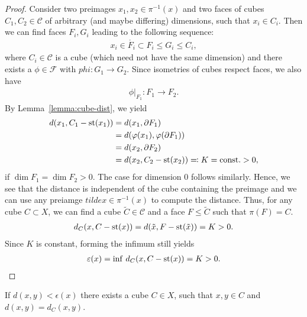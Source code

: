 \begin{proof}
  Consider two preimages \(x_1, x_2 \in \pi^{-1}(x)\) and two faces of cubes \(C_1, C_2 \in \mathcal{C}\) of arbitrary (and maybe differing) dimensions, such that \(x_i \in C_i\). Then we can find faces \(F_i, G_i\) leading to the following sequence:
  \begin{align*}
    x_i \in \mathring{F_i} \subset F_i \leq G_i \leq C_i,
  \end{align*}
  where \(C_i \in \mathcal{C}\) is a cube (which need not have the same dimension) and there exists a \(\phi \in \mathcal{F}\) with \(phi \colon G_1 \to G_2\). Since isometries of cubes respect faces, we also have
  \begin{align*}
    \phi|_{F_1} \colon F_1 \to F_2.
  \end{align*}
  By Lemma~\ref{lemma:cube-dist}, we yield
  \begin{align*}
    d(x_1, C_1 - \operatorname{st}(x_1))
    & = d(x_1, \partial F_1)\\
    & = d(\varphi(x_1), \varphi(\partial F_1))\\
    & = d(x_2, \partial F_2)\\
    & = d(x_2, C_2 - \operatorname{st}(x_2)) \eqqcolon K = \text{const.} > 0,
  \end{align*}
  if \(\dim F_1 = \dim F_2 > 0\). The case for dimension 0 follows similarly. Hence, we see that the distance is independent of the cube containing the preimage and we can use any preiamge \(tilde x \in \pi^{-1}(x)\) to compute the distance. Thus, for any cube \(C \subset X\), we can find a cube \(\tilde C \in \mathcal{C}\) and a face \(F \leq \tilde C\) such that \(\pi(F) = C\).
  \begin{align*}
    d_C(x, C - \operatorname{st}(x)) = d(\tilde x, F - \operatorname{st}(\tilde x)) = K > 0.
  \end{align*}
  Since \(K\) is constant, forming the infimum still yields
  \begin{align*}
    \varepsilon(x) = \inf\,d_C(x, C - \operatorname{st}(x)) = K > 0.
  \end{align*}
\end{proof}

\begin{lemma}
  If \(d(x,y) < \epsilon(x)\) there exists a cube \(C \in X\), such that \(x,y \in C\) and \(d(x,y) = d_C(x,y)\).
\end{lemma}

